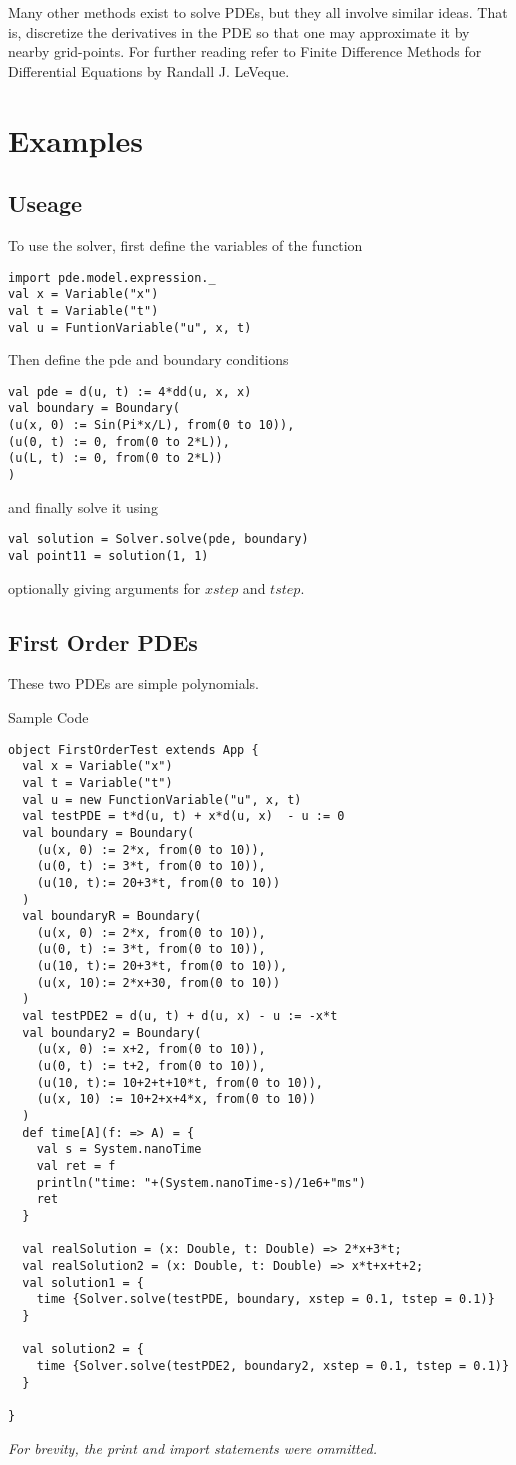 Many other methods exist to solve PDEs, but they all involve similar
ideas. That is, discretize the derivatives in the PDE so that one may
approximate it by nearby grid-points. For further reading refer to Finite Difference Methods for
Differential Equations by Randall J. LeVeque\cite{leveque}.
\section{Examples}
\subsection{Useage}
To use the solver, first define the variables of the function
\begin{verbatim}
import pde.model.expression._
val x = Variable("x")
val t = Variable("t")
val u = FuntionVariable("u", x, t)
\end{verbatim}
Then define the pde and boundary conditions
\begin{verbatim}
val pde = d(u, t) := 4*dd(u, x, x)
val boundary = Boundary(
(u(x, 0) := Sin(Pi*x/L), from(0 to 10)),
(u(0, t) := 0, from(0 to 2*L)),
(u(L, t) := 0, from(0 to 2*L))
)
\end{verbatim}
and finally solve it using
\begin{verbatim}
val solution = Solver.solve(pde, boundary)
val point11 = solution(1, 1)
\end{verbatim}
optionally giving arguments for $xstep$ and $tstep$.
\subsection{First Order PDEs}
These two PDEs are simple polynomials.

\noindent Sample Code
\begin{verbatim}
object FirstOrderTest extends App {
  val x = Variable("x")
  val t = Variable("t")
  val u = new FunctionVariable("u", x, t)
  val testPDE = t*d(u, t) + x*d(u, x)  - u := 0
  val boundary = Boundary(
    (u(x, 0) := 2*x, from(0 to 10)),
    (u(0, t) := 3*t, from(0 to 10)),
    (u(10, t):= 20+3*t, from(0 to 10))
  )
  val boundaryR = Boundary(
    (u(x, 0) := 2*x, from(0 to 10)),
    (u(0, t) := 3*t, from(0 to 10)),
    (u(10, t):= 20+3*t, from(0 to 10)),
    (u(x, 10):= 2*x+30, from(0 to 10))
  )
  val testPDE2 = d(u, t) + d(u, x) - u := -x*t
  val boundary2 = Boundary(
    (u(x, 0) := x+2, from(0 to 10)),
    (u(0, t) := t+2, from(0 to 10)),
    (u(10, t):= 10+2+t+10*t, from(0 to 10)),
    (u(x, 10) := 10+2+x+4*x, from(0 to 10))
  )
  def time[A](f: => A) = {
    val s = System.nanoTime
    val ret = f
    println("time: "+(System.nanoTime-s)/1e6+"ms")
    ret
  }

  val realSolution = (x: Double, t: Double) => 2*x+3*t;
  val realSolution2 = (x: Double, t: Double) => x*t+x+t+2;
  val solution1 = {
    time {Solver.solve(testPDE, boundary, xstep = 0.1, tstep = 0.1)}
  }

  val solution2 = {
    time {Solver.solve(testPDE2, boundary2, xstep = 0.1, tstep = 0.1)}
  }

}
\end{verbatim}
\emph{For brevity, the print and import statements were ommitted.}


